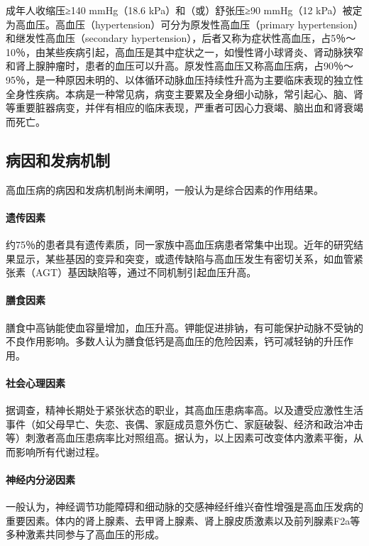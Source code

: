 成年人收缩压≥140 mmHg（18.6 kPa）和（或）舒张压≥90 mmHg（12
kPa）被定为高血压。高血压（hypertension）可分为原发性高血压（primary
hypertension）和继发性高血压（secondary
hypertension），后者又称为症状性高血压，占5％～10％，由某些疾病引起，高血压是其中症状之一，如慢性肾小球肾炎、肾动脉狭窄和肾上腺肿瘤时，患者的血压可以升高。原发性高血压又称高血压病，占90％～95％，是一种原因未明的、以体循环动脉血压持续性升高为主要临床表现的独立性全身性疾病。本病是一种常见病，病变主要累及全身细小动脉，常引起心、脑、肾等重要脏器病变，并伴有相应的临床表现，严重者可因心力衰竭、脑出血和肾衰竭而死亡。

\subsection{病因和发病机制}

高血压病的病因和发病机制尚未阐明，一般认为是综合因素的作用结果。

\paragraph{遗传因素}
约75％的患者具有遗传素质，同一家族中高血压病患者常集中出现。近年的研究结果显示，某些基因的变异和突变，或遗传缺陷与高血压发生有密切关系，如血管紧张素（AGT）基因缺陷等，通过不同机制引起血压升高。

\paragraph{膳食因素}
膳食中高钠能使血容量增加，血压升高。钾能促进排钠，有可能保护动脉不受钠的不良作用影响。多数人认为膳食低钙是高血压的危险因素，钙可减轻钠的升压作用。

\paragraph{社会心理因素}
据调查，精神长期处于紧张状态的职业，其高血压患病率高。以及遭受应激性生活事件（如父母早亡、失恋、丧偶、家庭成员意外伤亡、家庭破裂、经济和政治冲击等）刺激者高血压患病率比对照组高。据认为，以上因素可改变体内激素平衡，从而影响所有代谢过程。

\paragraph{神经内分泌因素}
一般认为，神经调节功能障碍和细动脉的交感神经纤维兴奋性增强是高血压发病的重要因素。体内的肾上腺素、去甲肾上腺素、肾上腺皮质激素以及前列腺素F2a等多种激素共同参与了高血压的形成。

